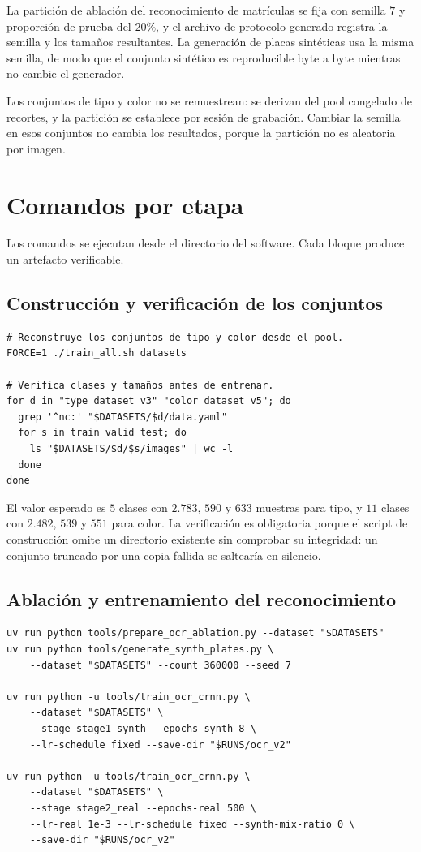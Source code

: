 La partición de ablación del reconocimiento de matrículas se fija con semilla
$7$ y proporción de prueba del $20\%$, y el archivo de protocolo generado registra
la semilla y los tamaños resultantes. La generación de placas sintéticas usa la
misma semilla, de modo que el conjunto sintético es reproducible byte a byte
mientras no cambie el generador.

Los conjuntos de tipo y color no se remuestrean: se derivan del pool congelado de
recortes, y la partición se establece por sesión de grabación. Cambiar la semilla
en esos conjuntos no cambia los resultados, porque la partición no es aleatoria por
imagen.

\section{Comandos por etapa}

Los comandos se ejecutan desde el directorio del software. Cada bloque produce un
artefacto verificable.

\subsection{Construcción y verificación de los conjuntos}

\begin{verbatim}
# Reconstruye los conjuntos de tipo y color desde el pool.
FORCE=1 ./train_all.sh datasets

# Verifica clases y tamaños antes de entrenar.
for d in "type dataset v3" "color dataset v5"; do
  grep '^nc:' "$DATASETS/$d/data.yaml"
  for s in train valid test; do
    ls "$DATASETS/$d/$s/images" | wc -l
  done
done
\end{verbatim}

El valor esperado es $5$ clases con $2.783$, $590$ y $633$ muestras para tipo, y
$11$ clases con $2.482$, $539$ y $551$ para color. La verificación es obligatoria
porque el script de construcción omite un directorio existente sin comprobar su
integridad: un conjunto truncado por una copia fallida se saltearía en silencio.

\subsection{Ablación y entrenamiento del reconocimiento}

\begin{verbatim}
uv run python tools/prepare_ocr_ablation.py --dataset "$DATASETS"
uv run python tools/generate_synth_plates.py \
    --dataset "$DATASETS" --count 360000 --seed 7

uv run python -u tools/train_ocr_crnn.py \
    --dataset "$DATASETS" \
    --stage stage1_synth --epochs-synth 8 \
    --lr-schedule fixed --save-dir "$RUNS/ocr_v2"

uv run python -u tools/train_ocr_crnn.py \
    --dataset "$DATASETS" \
    --stage stage2_real --epochs-real 500 \
    --lr-real 1e-3 --lr-schedule fixed --synth-mix-ratio 0 \
    --save-dir "$RUNS/ocr_v2"
\end{verbatim}

